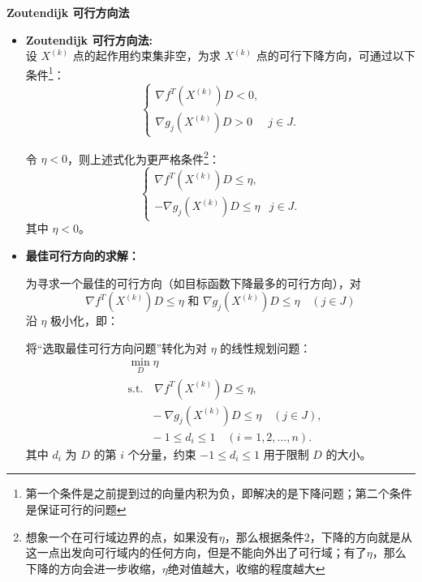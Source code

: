 \begin{notebox}{\textbf{Zoutendijk 可行方向法}}{}
    \begin{itemize}
    \item \textbf{Zoutendijk 可行方向法:}\\
    设 \( X^{(k)} \) 点的起作用约束集非空，为求 \( X^{(k)} \) 点的可行下降方向，可通过以下条件\footnote{第一个条件是之前提到过的向量内积为负，即解决的是下降问题；第二个条件是保证可行的问题}：
    \[
    \begin{cases}
        \nabla f^T \left( X^{(k)} \right) D < 0, \\
        \nabla g_j \left( X^{(k)} \right) D > 0 & j \in J.
    \end{cases}
    \]
    
    令 \(\eta < 0\)，则上述式化为更严格条件\footnote{想象一个在可行域边界的点，如果没有$\eta$，那么根据条件2，下降的方向就是从这一点出发向可行域内的任何方向，但是不能向外出了可行域；有了$\eta$，那么下降的方向会进一步收缩，$\eta$绝对值越大，收缩的程度越大}：
    \[
    \begin{cases}
        \nabla f^T \left( X^{(k)} \right) D \leq \eta, \\
        -\nabla g_j \left( X^{(k)} \right) D \leq \eta & j \in J.
    \end{cases}
    \]
    其中 \(\eta < 0\)。

    \item \textbf{最佳可行方向的求解：}
    
    为寻求一个最佳的可行方向（如目标函数下降最多的可行方向），对
    \[
    \nabla f^T \left( X^{(k)} \right) D \leq \eta \text{ 和 } \nabla g_j \left( X^{(k)} \right) D \leq \eta \quad (j \in J)
    \]
    沿 \(\eta\) 极小化，即：
    
    将“选取最佳可行方向问题”转化为对 \(\eta\) 的线性规划问题：
    \[
    \begin{aligned}
        & \min_D \eta \\
        & \text{s.t.} \quad \nabla f^T \left( X^{(k)} \right) D \leq \eta, \\
        & \qquad -\nabla g_j \left( X^{(k)} \right) D \leq \eta \quad (j \in J), \\
        & \qquad -1 \leq d_i \leq 1 \quad (i = 1, 2, \dots, n).
    \end{aligned}
    \]
    其中 \(d_i\) 为 \(D\) 的第 \(i\) 个分量，约束 \(-1 \leq d_i \leq 1\) 用于限制 \(D\) 的大小。
\end{itemize}
\end{notebox}
 
